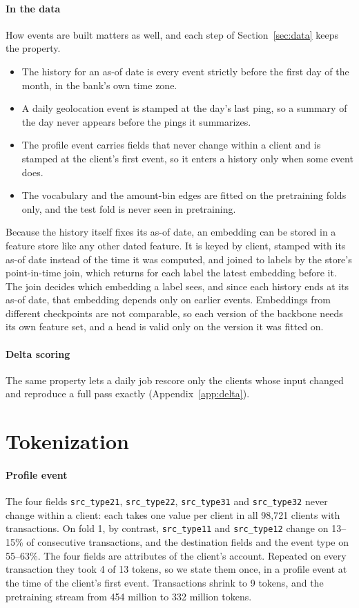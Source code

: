 \documentclass[12pt]{article}
\newcommand{\tok}[1]{\texttt{#1}}
\begin{document}
\paragraph{In the data} How events are built matters as well, and each step of Section~\ref{sec:data} keeps the property.
\begin{itemize}
\item The history for an as-of date is every event strictly before the first day of the month, in the bank's own time zone.
\item A daily geolocation event is stamped at the day's last ping, so a summary of the day never appears before the pings it summarizes.
\item The profile event carries fields that never change within a client and is stamped at the client's first event, so it enters a history only when some event does.
\item The vocabulary and the amount-bin edges are fitted on the pretraining folds only, and the test fold is never seen in pretraining.
\end{itemize}

Because the history itself fixes its as-of date, an embedding can be stored in a feature store like any other dated feature. It is keyed by client, stamped with its as-of date instead of the time it was computed, and joined to labels by the store's point-in-time join, which returns for each label the latest embedding before it. The join decides which embedding a label sees, and since each history ends at its as-of date, that embedding depends only on earlier events. Embeddings from different checkpoints are not comparable, so each version of the backbone needs its own feature set, and a head is valid only on the version it was fitted on.

\paragraph{Delta scoring} The same property lets a daily job rescore only the clients whose input changed and reproduce a full pass exactly (Appendix~\ref{app:delta}).

\section{Tokenization}\label{app:tokens}

\paragraph{Profile event} The four fields \tok{src\_type21}, \tok{src\_type22}, \tok{src\_type31} and \tok{src\_type32} never change within a client: each takes one value per client in all 98,721 clients with transactions. On fold 1, by contrast, \tok{src\_type11} and \tok{src\_type12} change on 13--15\% of consecutive transactions, and the destination fields and the event type on 55--63\%. The four fields are attributes of the client's account. Repeated on every transaction they took 4 of 13 tokens, so we state them once, in a profile event at the time of the client's first event. Transactions shrink to 9 tokens, and the pretraining stream from 454 million to 332 million tokens.
\end{document}

